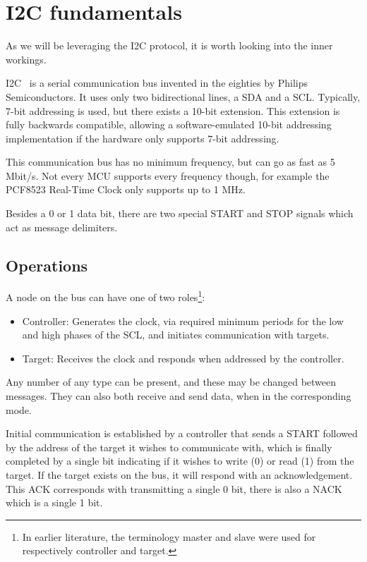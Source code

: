 \section{I2C fundamentals}
\label{chap:i2c}

As we will be leveraging the \gls{I2C} protocol, it is worth looking into the inner workings. 

\gls{I2C}~\cite{nxp:i2c} is a serial communication bus invented in the eighties by Philips Semiconductors. It uses only two bidirectional lines, a \gls{SDA} and a \gls{SCL}. Typically, 7-bit addressing is used, but there exists a 10-bit extension. This extension is fully backwards compatible, allowing a software-emulated 10-bit addressing implementation if the hardware only supports 7-bit addressing.

This communication bus has no minimum frequency, but can go as fast as 5 Mbit/s. Not every \gls{MCU} supports every frequency though, for example the PCF8523 Real-Time Clock only supports up to 1 MHz.

Besides a 0 or 1 data bit, there are two special START and STOP signals which act as message delimiters.

\subsection{Operations}

A node on the bus can have one of two roles\footnote{In earlier literature, the terminology master and slave were used for respectively controller and target.}:
\begin{itemize}
    \item Controller: Generates the clock, via required minimum periods for the low and high phases of the \gls{SCL}, and initiates communication with targets.
    \item Target: Receives the clock and responds when addressed by the controller.
\end{itemize}
Any number of any type can be present, and these may be changed between messages. They can also both receive and send data, when in the corresponding mode.

Initial communication is established by a controller that sends a START followed by the address of the target it wishes to communicate with, which is finally completed by a single bit indicating if it wishes to write (0) or read (1) from the target. If the target exists on the bus, it will respond with an acknowledgement. This \gls{ACK} corresponds with transmitting a single 0 bit, there is also a \gls{NACK} which is a single 1 bit.

